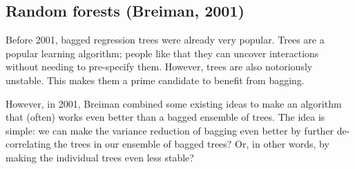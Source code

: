 \subsection{Random forests (Breiman, 2001)}

Before 2001, bagged regression trees were already very popular. Trees are a popular learning algorithm; people like that they can uncover interactions without needing to pre-specify them. However, trees are also notoriously unstable. This makes them a prime candidate to benefit from bagging. 

However, in 2001, Breiman combined some existing ideas to make an algorithm that (often) works even better than a bagged ensemble of trees. The idea is simple: we can make the variance reduction of bagging even better by further de-correlating the trees in our ensemble of bagged trees? Or, in other words, by making the individual trees even less stable? 

